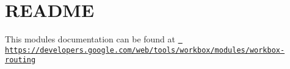 \chapter{README}
\hypertarget{md_node__modules_2workbox-routing_2README}{}\label{md_node__modules_2workbox-routing_2README}
This module\textquotesingle{}s documentation can be found at \href{https://developers.google.com/web/tools/workbox/modules/workbox-routing}{\texttt{ https\+://developers.\+google.\+com/web/tools/workbox/modules/workbox-\/routing}} 